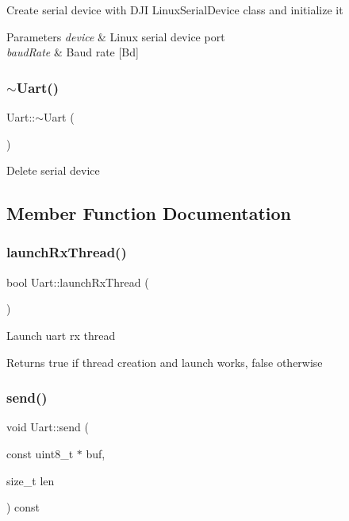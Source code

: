 Create serial device with D\+JI Linux\+Serial\+Device class and initialize it 
\begin{DoxyParams}{Parameters}
{\em device} & Linux serial device port \\
\hline
{\em baud\+Rate} & Baud rate \mbox{[}Bd\mbox{]} \\
\hline
\end{DoxyParams}
\mbox{\label{class_m210_1_1_uart_a7160154094413395a23dbaa287dbef3c}} 
\subsubsection{\texorpdfstring{$\sim$\+Uart()}{~Uart()}}
{\footnotesize\ttfamily Uart\+::$\sim$\+Uart (\begin{DoxyParamCaption}{ }\end{DoxyParamCaption})}

Delete serial device 

\subsection{Member Function Documentation}
\mbox{\label{class_m210_1_1_uart_ad793a587c421c2e8d6bde5d6ddfd95d8}} 
\subsubsection{\texorpdfstring{launch\+Rx\+Thread()}{launchRxThread()}}
{\footnotesize\ttfamily bool Uart\+::launch\+Rx\+Thread (\begin{DoxyParamCaption}{ }\end{DoxyParamCaption})}

Launch uart rx thread \begin{DoxyReturn}{Returns}
true if thread creation and launch works, false otherwise 
\end{DoxyReturn}
\mbox{\label{class_m210_1_1_uart_a7aa2fba14c420024a1e2ec9079684def}} 
\subsubsection{\texorpdfstring{send()}{send()}}
{\footnotesize\ttfamily void Uart\+::send (\begin{DoxyParamCaption}\item[{const uint8\+\_\+t $\ast$}]{buf,  }\item[{size\+\_\+t}]{len }\end{DoxyParamCaption}) const}

